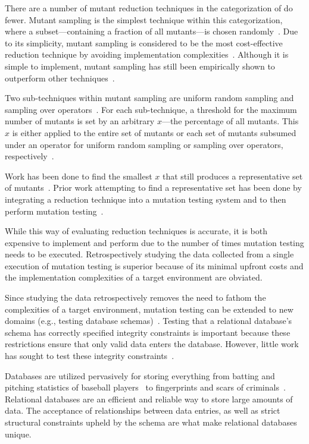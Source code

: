 There are a number of mutant reduction techniques in the categorization of do fewer.  Mutant sampling is the simplest
technique within this categorization, where a subset---containing a fraction of all mutants---is chosen
randomly~\cite{wong1995reducing}.  Due to its simplicity, mutant sampling is considered to be the most cost-effective
reduction technique by avoiding implementation complexities~\cite{gopinath2015mutation}.  Although it is simple to
implement, mutant sampling has still been empirically shown to outperform other techniques~\cite{zhang2010operator}.

Two sub-techniques within mutant sampling are uniform random sampling and sampling over
operators~\cite{gopinath2015mutation, gopinath2015empirical}.  For each sub-technique, a threshold for the maximum
number of mutants is set by an arbitrary $x$---the percentage of all mutants.  This $x$ is either applied to the entire
set of mutants or each set of mutants subsumed under an operator for uniform random sampling or sampling over operators,
respectively~\cite{gopinath2015mutation, gopinath2015empirical}.

Work has been done to find the smallest $x$ that still produces
a representative set of mutants~\cite{jia2011analysis, mathur1994empirical}. Prior work
attempting to find a representative set has been done by integrating a reduction technique into
a mutation testing system and to then perform mutation testing~\cite{demillo1988extended, king1991fortran}.

While this way of evaluating reduction techniques is accurate, it is both
expensive to implement and perform due to the number of times mutation testing
needs to be executed. Retrospectively studying the data
collected from a single execution of mutation testing is superior
because of its minimal upfront costs and the implementation complexities of
a target environment are obviated.

Since studying the data retrospectively removes the need to fathom the complexities of a target environment,
mutation testing can be extended to new domains (e.g., testing database schemas)~\cite{mcminn2016virtual, mcminn2015effectiveness, wright2013efficient}.
Testing that a relational database's schema has correctly specified integrity constraints is important
because these restrictions ensure that only valid data enters the database. However, little work has
sought to test these integrity constraints~\cite{mcminn2016virtual}.

Databases are utilized pervasively for storing everything from batting and pitching statistics of baseball
players~\cite{lahmanbaseball} to fingerprints and scars of criminals~\cite{ngi}.
Relational databases are an efficient and reliable way to store large amounts of data.
The acceptance of relationships between data entries, as well as strict structural constraints
upheld by the schema are what make relational databases unique.

